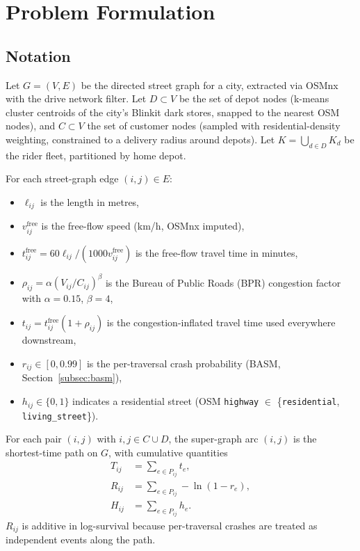 \documentclass{ieeeaccess}
\begin{document}
\section{Problem Formulation}
\label{sec:formulation}

\subsection{Notation}
Let $G = (V, E)$ be the directed street graph for a city, extracted
via OSMnx \cite{boeing2017osmnx} with the drive network filter. Let $D \subset V$ be the set
of depot nodes (k-means cluster centroids of the city's Blinkit dark
stores, snapped to the nearest OSM nodes), and $C \subset V$ the set
of customer nodes (sampled with residential-density weighting,
constrained to a delivery radius around depots). Let
$K = \bigcup_{d \in D} K_d$ be the rider fleet, partitioned by home
depot.

For each street-graph edge $(i, j) \in E$:
\begin{itemize}
\item $\ell_{ij}$ is the length in metres,
\item $v_{ij}^{\text{free}}$ is the free-flow speed (km/h, OSMnx imputed),
\item $t_{ij}^{\text{free}} = 60 \ell_{ij} / (1000 v_{ij}^{\text{free}})$ is the free-flow travel time in minutes,
\item $\rho_{ij} = \alpha (V_{ij}/C_{ij})^{\beta}$ is the Bureau of Public Roads (BPR) \cite{bpr1964} congestion factor with $\alpha = 0.15$, $\beta = 4$,
\item $t_{ij} = t_{ij}^{\text{free}} (1 + \rho_{ij})$ is the congestion-inflated travel time used everywhere downstream,
\item $r_{ij} \in [0, 0.99]$ is the per-traversal crash probability (BASM, Section~\ref{subsec:basm}),
\item $h_{ij} \in \{0, 1\}$ indicates a residential street (OSM \texttt{highway} $\in$ \{\texttt{residential}, \texttt{living\_street}\}).
\end{itemize}

For each pair $(i, j)$ with $i, j \in C \cup D$, the super-graph arc
$(i, j)$ is the shortest-time path on $G$, with cumulative quantities
\begin{align}
T_{ij} &= \sum_{e \in P_{ij}} t_e, \label{eq:Tij} \\
R_{ij} &= \sum_{e \in P_{ij}} -\ln(1 - r_e), \label{eq:Rij} \\
H_{ij} &= \sum_{e \in P_{ij}} h_e. \label{eq:Hij}
\end{align}
$R_{ij}$ is additive in log-survival because per-traversal crashes are
treated as independent events along the path.
\end{document}
